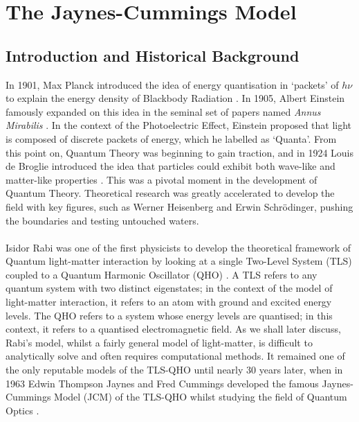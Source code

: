 \documentclass[12pt,a4paper]{article}
\begin{document}
\newpage

\section{The Jaynes-Cummings Model} \label{sec_TLS-QHO}

\subsection{Introduction and Historical Background} \label{subsec_history}

In 1901, Max Planck introduced the idea of energy quantisation in `packets' of $h\nu$ to explain the energy density of Blackbody Radiation \cite{Context1901-Planck}. In 1905, Albert Einstein famously expanded on this idea in the seminal set of papers named \textit{Annus Mirabilis} \cite{Context1905-Einstein}. In the context of the Photoelectric Effect, Einstein proposed that light is composed of discrete packets of energy, which he labelled as `Quanta'. From this point on, Quantum Theory was beginning to gain traction, and in 1924 Louis de Broglie introduced the idea that particles could exhibit both wave-like and matter-like properties \cite{Context1924-DeBroglie}. This was a pivotal moment in the development of Quantum Theory. Theoretical research was greatly accelerated to develop the field with key figures, such as Werner Heisenberg and Erwin Schrödinger, pushing the boundaries and testing untouched waters. \\
\\
Isidor Rabi was one of the first physicists to develop the theoretical framework of Quantum light-matter interaction by looking at a single Two-Level System (TLS) coupled to a Quantum Harmonic Oscillator (QHO) \cite{Context1936-Rabi}. A TLS refers to any quantum system with two distinct eigenstates; in the context of the model of light-matter interaction, it refers to an atom with ground and excited energy levels. The QHO refers to a system whose energy levels are quantised; in this context, it refers to a quantised electromagnetic field. As we shall later discuss, Rabi's model, whilst a fairly general model of light-matter, is difficult to analytically solve and often requires computational methods. It remained one of the only reputable models of the TLS-QHO until nearly 30 years later, when in 1963 Edwin Thompson Jaynes and Fred Cummings developed the famous Jaynes-Cummings Model (JCM) of the TLS-QHO whilst studying the field of Quantum Optics \cite{Context1963-JC_Original}. 
\end{document}
